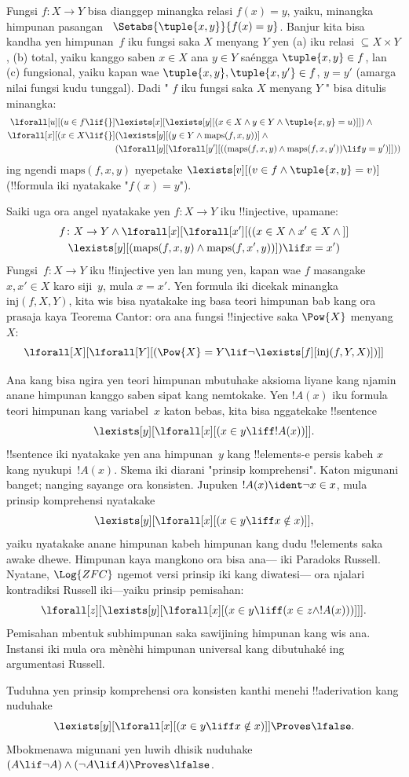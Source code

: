 \documentclass[../../../include/open-logic-section]{subfiles}
\begin{document}
Fungsi $f \colon X \to Y$ bisa dianggep minangka
relasi $f(x) = y$, yaiku, minangka himpunan pasangan~
$\Setabs{\tuple{x,y}}{f(x) = y}$. Banjur kita bisa
kandha yen himpunan~$f$ iku fungsi saka $X$ menyang
$Y$ yen (a) iku relasi
$\subseteq X \times Y$, (b) total, yaiku
kanggo saben $x \in X$ ana $y \in Y$ saéngga
$\tuple{x, y} \in f$, lan (c) fungsional,
yaiku kapan wae $\tuple{x, y}, \tuple{x, y'} \in f$,
$y = y'$ (amarga nilai fungsi kudu tunggal).
Dadi " $f$ iku fungsi saka $X$ menyang $Y$ "
bisa ditulis minangka:
\begin{align*}
 \lforall[u][(u \in f \lif {}] & \lexists[x][\lexists[y][(x \in X \land y \in
      Y \land \tuple{x, y} = u)]]) \land {}\\
 \lforall[x][(x \in X \lif {}] &
      (\lexists[y][(y \in Y \land \mathrm{maps}(f, x, y))] \land {}\\
& (\lforall[y][\lforall[y'][((\mathrm{maps}(f, x, y) \land
    \mathrm{maps}(f, x, y')) \lif y = y')]]))
\end{align*}
ing ngendi $\mathrm{maps}(f, x, y)$ nyepetake
$\lexists[v][(v \in f \land
  \tuple{x, y} = v)]$ (!!{formula} iki
nyatakake "$f(x) = y$").

Saiki uga ora angel nyatakake yen
$f\colon X \to Y$ iku !!{injective}, upamane:
\begin{multline*}
 f \colon X \to Y \land \lforall[x][\lforall[x'][((x \in X \land x' \in
     X \land {}]] \\
 \lexists[y][(\mathrm{maps}(f, x, y) \land \mathrm{maps}(f,
        x', y))]) \lif x = x')
\end{multline*}
Fungsi~$f\colon X \to Y$ iku !!{injective}
yen lan mung yen, kapan wae $f$ masangake
$x, x' \in X$ karo siji~$y$, mula $x = x'$.
Yen formula iki dicekak minangka
$\mathrm{inj}(f, X, Y)$, kita wis bisa
nyatakake ing basa teori himpunan bab kang
ora prasaja kaya Teorema Cantor:
ora ana fungsi !!{injective} saka $\Pow{X}$
menyang $X$:
\[
\lforall[X][\lforall[Y][(\Pow{X} = Y \lif
    \lnot\lexists[f][\mathrm{inj}(f, Y, X)])]]
\]

Ana kang bisa ngira yen teori himpunan mbutuhake
aksioma liyane kang njamin anane himpunan kanggo
saben sipat kang nemtokake. Yen $!A(x)$ iku formula
teori himpunan kang variabel~$x$ katon bebas,
kita bisa nggatekake !!{sentence}
\[
\lexists[y][\lforall[x][(x \in y \liff !A(x))]].
\]
!!{sentence} iki nyatakake yen ana himpunan~$y$
kang !!{element}s-e persis kabeh $x$ kang
nyukupi~$!A(x)$. Skema iki diarani
"prinsip komprehensi". Katon migunani banget;
nanging sayange ora konsisten. Jupuken
$!A(x) \ident \lnot x \in x$, mula prinsip
komprehensi nyatakake
\[
\lexists[y][\lforall[x][(x \in y \liff x \notin x)]],
\]
yaiku nyatakake anane himpunan kabeh himpunan
kang dudu !!{element}s saka awake dhewe.
Himpunan kaya mangkono ora bisa ana---
iki Paradoks Russell. Nyatane, $\Log{ZFC}$
ngemot versi prinsip iki kang diwatesi---
ora njalari kontradiksi Russell iki---yaiku prinsip pemisahan:
\[
\lforall[z][\lexists[y][\lforall[x][(x \in y \liff (x \in z \land
      !A(x)))]]].
\]
 Pemisahan mbentuk subhimpunan saka sawijining himpunan kang wis ana. Instansi iki mula ora mènèhi himpunan universal kang dibutuhaké ing argumentasi Russell.

\begin{prob}
Tuduhna yen prinsip komprehensi ora konsisten
kanthi menehi !!a{derivation} kang nuduhake
\[
\lexists[y][\lforall[x][(x \in y \liff x \notin x)]] \Proves \lfalse.
\]
Mbokmenawa migunani yen luwih dhisik nuduhake
$(A \lif \lnot A) \land (\lnot A \lif A)
\Proves \lfalse$.
\end{prob}
\end{document}
